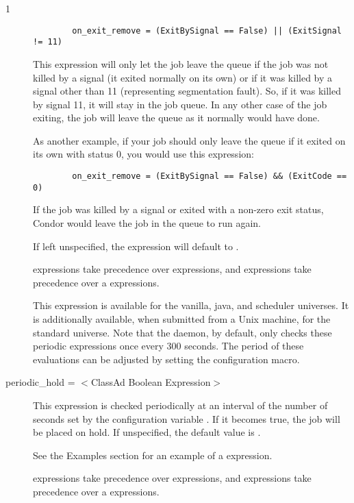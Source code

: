 \begin{ManPage}{\label{man-condor-submit}}{1}
\begin{description}
\begin{verbatim}
        on_exit_remove = (ExitBySignal == False) || (ExitSignal != 11)
\end{verbatim}
This expression will only let the job leave the queue if the job was
not killed by a signal (it exited normally on its own) or if it was
killed by a signal other than 11 (representing segmentation fault).
So, if it was killed by signal 11, it will stay in the job queue.
In any other case of the job exiting,
the job will leave the queue as it normally would have done.

As another example,
if your job should only leave the queue if it exited on its own with
status 0,
you would use this  expression:

\begin{verbatim}
        on_exit_remove = (ExitBySignal == False) && (ExitCode == 0)
\end{verbatim}
If the job was killed by a signal or exited with a non-zero exit
status, Condor would leave the job in the queue to run again.

If left unspecified, the  expression will
default to .

 expressions take
precedence over  expressions,
and  expressions take
precedence over a  expressions.

This expression is available for the vanilla, java, and scheduler universes.  It
is additionally available, when submitted from a Unix machine, for the
standard universe.  Note that the  daemon,
by default, only checks
these periodic expressions once every 300 seconds.  The period of
these evaluations can be adjusted by setting the
 configuration macro.



\item[periodic\_hold = $<$ClassAd Boolean Expression$>$]
This expression is checked periodically at an interval of
the number of seconds set by
the configuration variable .
If it becomes true, the job will be placed on hold.
If unspecified, the default value is .

See the Examples section for an example of a 
expression.

 expressions take
precedence over  expressions,
and  expressions take
precedence over a  expressions.


\end{description}
\end{ManPage}
